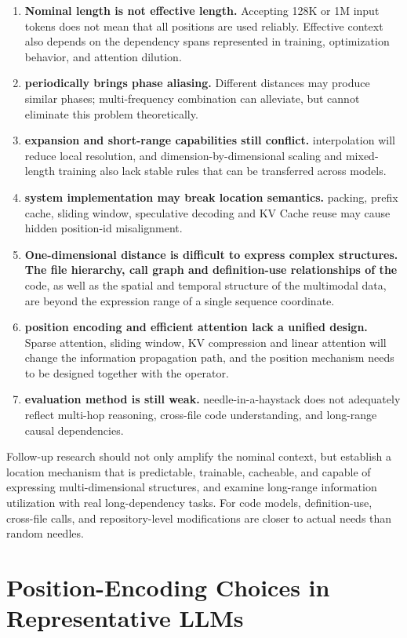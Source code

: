 \documentclass[UTF8,fontset=none,a4paper,10pt]{ctexart}
\begin{document}
\begin{enumerate}
\item \textbf{Nominal length is not effective length.} Accepting 128K or 1M input tokens does not mean that all positions are used reliably. Effective context also depends on the dependency spans represented in training, optimization behavior, and attention dilution.
\item \textbf{ periodically brings phase aliasing. } Different distances may produce similar phases; multi-frequency combination can alleviate, but cannot eliminate this problem theoretically.
\item \textbf{ expansion and short-range capabilities still conflict. } interpolation will reduce local resolution, and dimension-by-dimensional scaling and mixed-length training also lack stable rules that can be transferred across models.
\item \textbf{ system implementation may break location semantics. }packing, prefix cache, sliding window, speculative decoding and KV Cache reuse may cause hidden position-id misalignment.
\item \textbf{ One-dimensional distance is difficult to express complex structures. The file hierarchy, call graph and definition-use relationships of the } code, as well as the spatial and temporal structure of the multimodal data, are beyond the expression range of a single sequence coordinate.
\item \textbf{ position encoding and efficient attention lack a unified design. } Sparse attention, sliding window, KV compression and linear attention will change the information propagation path, and the position mechanism needs to be designed together with the operator.
\item \textbf{ evaluation method is still weak. }needle-in-a-haystack does not adequately reflect multi-hop reasoning, cross-file code understanding, and long-range causal dependencies.
\end{enumerate}

Follow-up research should not only amplify the nominal context, but establish a location mechanism that is predictable, trainable, cacheable, and capable of expressing multi-dimensional structures, and examine long-range information utilization with real long-dependency tasks. For code models, definition-use, cross-file calls, and repository-level modifications are closer to actual needs than random needles.

\clearpage
\appendix
\section{Position-Encoding Choices in Representative LLMs}
\end{document}

